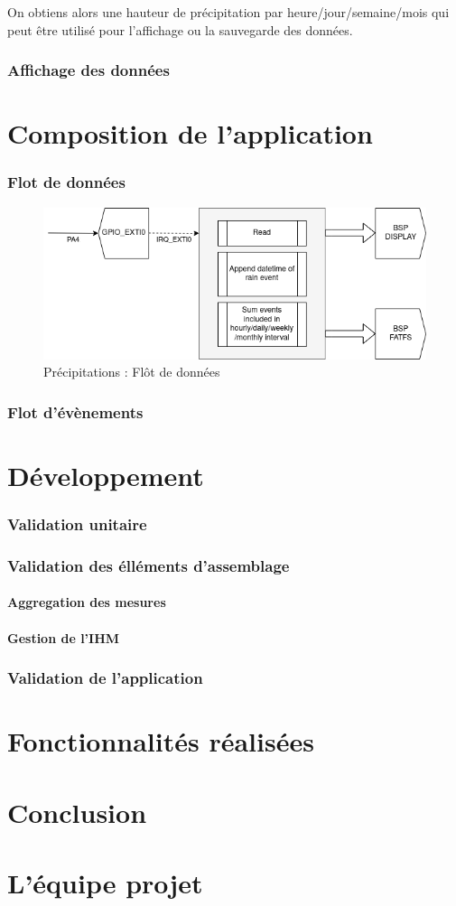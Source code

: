 \documentclass{article}
\begin{document}
            On obtiens alors une hauteur de précipitation par heure/jour/semaine/mois qui peut être utilisé pour l'affichage ou la sauvegarde des données.
        \section{Affichage des données}
    \part{Composition de l'application}	
        \section{Flot de données}
            \begin{figure}[H]
                \centering
                \includegraphics[width=0.8\columnwidth]{diagrammes/rain_fdd.drawio.png}
                \caption{Précipitations : Flôt de données}  \label{fig:fdd}
            \end{figure}
        \section{Flot d'évènements}
    \part{Développement}
        \section{Validation unitaire}
        \section{Validation des élléments d'assemblage}
            \subsection{Aggregation des mesures}
            \subsection{Gestion de l'IHM}
        \section{Validation de l'application}
    \part{Fonctionnalités réalisées}
    \part{Conclusion}
    \part{L'équipe projet}
    
\end{document}
